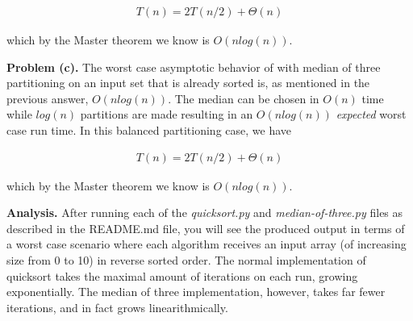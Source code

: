 \documentclass{article}
\begin{document}
\begin{gather}
    T(n) = 2T(n/2) + \Theta(n)
\end{gather}

which by the Master theorem we know is $O(nlog(n))$.

\hfill

\textbf{Problem (c).} The worst case asymptotic behavior of  with median of three partitioning on an input set that is already sorted is, as mentioned in the previous answer, $O(nlog(n))$. The median can be chosen in $O(n)$ time while $log(n)$ partitions are made resulting in an $O(nlog(n))$ \emph{expected} worst case run time. In this balanced partitioning case, we have

\begin{gather}
    T(n) = 2T(n/2) + \Theta(n)
\end{gather}

which by the Master theorem we know is $O(nlog(n))$.

\hfill

\textbf{Analysis.} After running each of the \emph{quicksort.py} and \emph{median-of-three.py} files as described in the README.md file, you will see the produced output in terms of a worst case scenario where each algorithm receives an input array (of increasing size from 0 to 10) in reverse sorted order. The normal implementation of quicksort takes the maximal amount of iterations on each run, growing exponentially. The median of three implementation, however, takes far fewer iterations, and in fact grows linearithmically. 

\newpage
 

\end{document}
